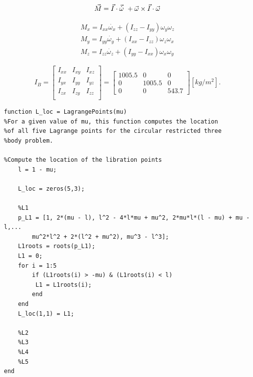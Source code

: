 \begin{equation}
\vec{M} = \vec{I} \cdot \vec{\dot{\omega}}\ + \vec{\omega} \times \vec{I} \cdot \vec{\omega} \\ 
\end{equation}   



\begin{eqnarray}
M_x = I_{xx} \dot{\omega_x} + (I_{zz} - I_{yy})\omega_y \omega_z \nonumber \\
M_y = I_{yy} \dot{\omega_y} + (I_{xx} - I_{zz})\omega_z \omega_x \\
M_z = I_{zz} \dot{\omega_z} + (I_{yy} - I_{xx})\omega_x \omega_y \nonumber
\end{eqnarray}

\begin{equation}
I_{B} =
\begin{bmatrix} 
I_{xx} & I_{xy} & I_{xz} \\
I_{yx} & I_{yy} & I_{yz} \\ 
I_{zx} & I_{zy} & I_{zz} \\
\end{bmatrix}
=
\begin{bmatrix}
1005.5 & 0 & 0 \\
0 & 1005.5 & 0 \\ 
0 & 0 & 543.7
\end{bmatrix}
[kg/m^2].
\end{equation}

\begin{lstlisting}
function L_loc = LagrangePoints(mu)
%For a given value of mu, this function computes the location
%of all five Lagrange points for the circular restricted three
%body problem.

%Compute the location of the libration points
    l = 1 - mu;

    L_loc = zeros(5,3);

    %L1
    p_L1 = [1, 2*(mu - l), l^2 - 4*l*mu + mu^2, 2*mu*l*(l - mu) + mu - l,...
        mu^2*l^2 + 2*(l^2 + mu^2), mu^3 - l^3];
    L1roots = roots(p_L1);
    L1 = 0;
    for i = 1:5
        if (L1roots(i) > -mu) & (L1roots(i) < l)
         L1 = L1roots(i);
        end
    end
    L_loc(1,1) = L1;

    %L2
    %L3
    %L4
    %L5
end
\end{lstlisting}
